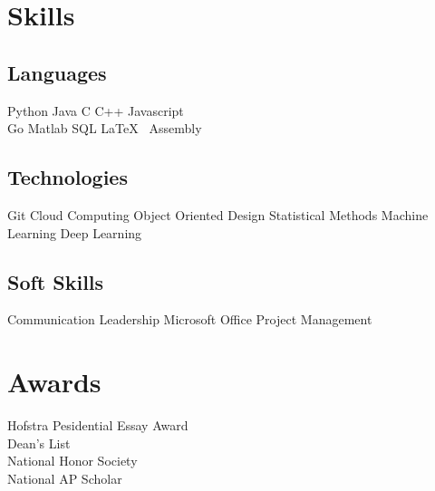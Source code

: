 \documentclass[]{deedy-resume-openfont}
\begin{document}
\begin{minipage}[t]{0.33\textwidth}

\section{Skills}
\subsection{Languages}
Python \textbullet{}   Java \textbullet{} C \textbullet{} C++ \textbullet Javascript \\
Go \textbullet{} Matlab \textbullet{} SQL \textbullet{} \LaTeX\  
\textbullet{} Assembly \\
\vspace{\topsep}
\subsection{Technologies}
Git \textbullet{}
Cloud Computing \textbullet{} Object Oriented Design 
\textbullet{} Statistical Methods 
\textbullet{} Machine Learning
\textbullet{} Deep Learning

\vspace{\topsep}
\subsection{Soft Skills}
Communication \textbullet{} Leadership \textbullet{} 
Microsoft Office \textbullet{} Project Management
\sectionsep

\section{Awards}
Hofstra Pesidential Essay Award \\
Dean's List \\
National Honor Society \\
National AP Scholar
%
%

\end{minipage} 
\hfill
\end{document}
